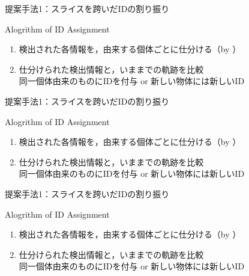 \begin{frame}{提案手法1：スライスを跨いだIDの割り振り}
    \begin{block}{Alogrithm of ID Assignment}
        \begin{enumerate}
            \item 検出された各情報を，由来する個体ごとに仕分ける（by \textbf{}）
            \item 仕分けられた検出情報と，いままでの軌跡を比較 
            \\\ra 同一個体由来のものにIDを付与 or 新しい物体には新しいID
        \end{enumerate}
    \end{block}
\end{frame}
\begin{frame}[noframenumbering]{提案手法1：スライスを跨いだIDの割り振り}
    \begin{block}{Alogrithm of ID Assignment}
        \begin{enumerate}
            \item 検出された各情報を，由来する個体ごとに仕分ける（by \textbf{}）
            \item 仕分けられた検出情報と，いままでの軌跡を比較 
            \\\ra 同一個体由来のものにIDを付与 or 新しい物体には新しいID
        \end{enumerate}
    \end{block}    
\end{frame}
\begin{frame}[noframenumbering]{提案手法1：スライスを跨いだIDの割り振り}
    \begin{block}{Alogrithm of ID Assignment}
        \begin{enumerate}
            \item 検出された各情報を，由来する個体ごとに仕分ける（by \textbf{}）
            \item 仕分けられた検出情報と，いままでの軌跡を比較 
            \\\ra 同一個体由来のものにIDを付与 or 新しい物体には新しいID
        \end{enumerate}
    \end{block}    
\end{frame}
